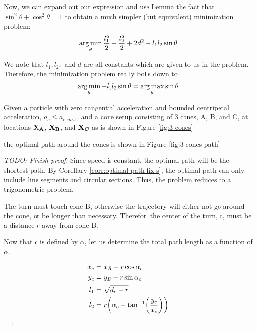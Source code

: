 Now, we can expand out our expression and use Lemma the fact that $\sin^2 \theta + \cos^2 \theta = 1$ to obtain a much simpler (but equivalent) minimization problem:
\begin{eqnarray}
  \operatorname*{arg\,min}_{\theta} \frac{l_1^2}{2} + \frac{l_2^2}{2} + 2d^2 - l_1 l_2 \sin \theta
\end{eqnarray}

We note that $l_1, l_2,$ and $d$ are all constants which are given to us in the problem. Therefore, the minimization problem really boils down to
\begin{eqnarray}
  \operatorname*{arg\,min}_{\theta} - l_1 l_2 \sin \theta = \operatorname*{arg\,max}_{\theta} \sin \theta
\end{eqnarray}


\begin{theorem}

Given a particle with zero tangential acceleration and bounded centripetal acceleration, $a_c \le a_{c,max}$, and a cone setup consisting of 3 cones, A, B, and C, at locations $\mathbf{X_A}$, $\mathbf{X_B}$, and $\mathbf{X_C}$ as is shown in Figure \ref{fig:3-cones}


the optimal path around the cones is shown in Figure \ref{fig:3-cones-path}


\end{theorem}

\begin{proof}
[TODO: Finish proof]

Since speed is constant, the optimal path will be the shortest path. By Corollary \ref{corr:optimal-path-fix-s}, the optimal path can only include line segments and circular sections. Thus, the problem reduces to a trigonometric problem.

The turn must touch cone B, otherwise the trajectory will either not go around the cone, or be longer than necessary. Therefor, the center of the turn, c, must be a distance $r$ away from cone B.


Now that c is defined by $\alpha$, let us determine the total path length as a function of $\alpha$.


\begin{align*}
x_c& = x_B - r \cos{\alpha_c}\\
y_c& = y_B - r \sin{\alpha_c}\\
l_1& = \sqrt{d_c - r}\\
l_2& = r \paren{\alpha_c - \tan^{-1}\paren{\frac{y_c}{x_c}}}\\
\end{align*}
\end{proof}